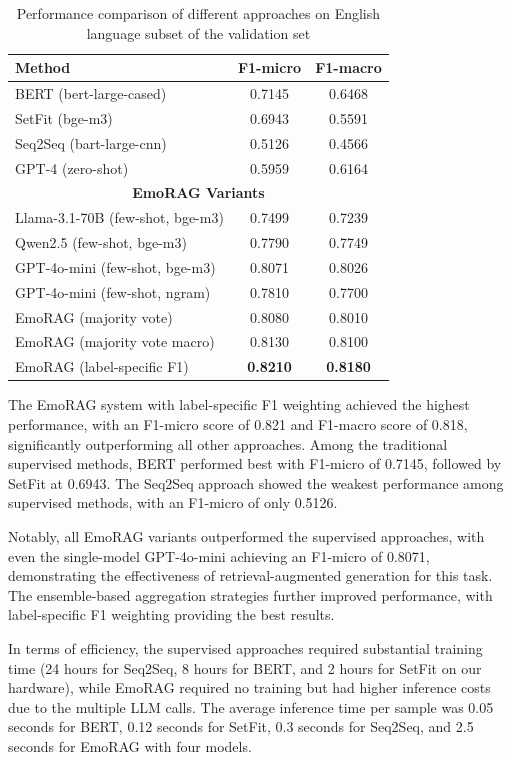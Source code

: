\documentclass[a4paper,12pt]{extarticle}
\begin{document}
\begin{table}[h]
\centering
\begin{tabular}{lcc}
\toprule
\textbf{Method} & \textbf{F1-micro} & \textbf{F1-macro} \\
\midrule
BERT (bert-large-cased) & 0.7145 & 0.6468 \\
SetFit (bge-m3) & 0.6943 & 0.5591 \\
Seq2Seq (bart-large-cnn) & 0.5126 & 0.4566 \\
GPT-4 (zero-shot) & 0.5959 & 0.6164 \\
\midrule
\multicolumn{3}{c}{\textbf{EmoRAG Variants}} \\
\midrule
Llama-3.1-70B (few-shot, bge-m3) & 0.7499 & 0.7239 \\
Qwen2.5 (few-shot, bge-m3) & 0.7790 & 0.7749 \\
GPT-4o-mini (few-shot, bge-m3) & 0.8071 & 0.8026 \\
GPT-4o-mini (few-shot, ngram) & 0.7810 & 0.7700 \\
EmoRAG (majority vote) & 0.8080 & 0.8010 \\
EmoRAG (majority vote macro) & 0.8130 & 0.8100 \\
EmoRAG (label-specific F1) & \textbf{0.8210} & \textbf{0.8180} \\
\bottomrule
\end{tabular}
\caption{Performance comparison of different approaches on English language subset of the validation set}
\label{tab:english_comparison}
\end{table}

The EmoRAG system with label-specific F1 weighting achieved the highest performance, with an F1-micro score of 0.821 and F1-macro score of 0.818, significantly outperforming all other approaches. Among the traditional supervised methods, BERT performed best with F1-micro of 0.7145, followed by SetFit at 0.6943. The Seq2Seq approach showed the weakest performance among supervised methods, with an F1-micro of only 0.5126.

Notably, all EmoRAG variants outperformed the supervised approaches, with even the single-model GPT-4o-mini achieving an F1-micro of 0.8071, demonstrating the effectiveness of retrieval-augmented generation for this task. The ensemble-based aggregation strategies further improved performance, with label-specific F1 weighting providing the best results.

In terms of efficiency, the supervised approaches required substantial training time (24 hours for Seq2Seq, 8 hours for BERT, and 2 hours for SetFit on our hardware), while EmoRAG required no training but had higher inference costs due to the multiple LLM calls. The average inference time per sample was 0.05 seconds for BERT, 0.12 seconds for SetFit, 0.3 seconds for Seq2Seq, and 2.5 seconds for EmoRAG with four models.
\end{document}
